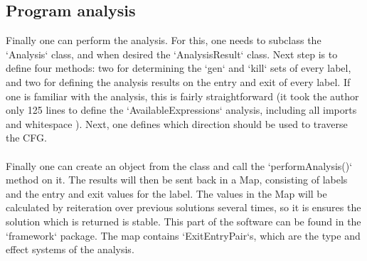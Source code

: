 \documentclass[paper=a4, fontsize=11pt]{scrartcl} %
\numberwithin{equation}{section} %
\numberwithin{figure}{section} %
\numberwithin{table}{section} %
\begin{document}
\subsection{Program analysis}

Finally one can perform the analysis.
For this, one needs to subclass the `Analysis` class, and when desired the `AnalysisResult` class.
Next step is to define four methods: two for determining the `gen` and `kill` sets of every label, and two for defining the analysis results on the entry and exit of every label.
If one is familiar with the analysis, this is fairly straightforward (it took the author only 125 lines to define the `AvailableExpressions` analysis, including all imports and whitespace \cite{ar}). Next, one defines which direction should be used to traverse the CFG.
\\
\\
Finally one can create an object from the class and call the `performAnalysis()` method on it.
The results will then be sent back in a Map, consisting of labels and the entry and exit values for the label.
The values in the Map will be calculated by reiteration over previous solutions several times, so it is ensures the solution which is returned is stable.
This part of the software can be found in the `framework` package. The map contains `ExitEntryPair`s, which are the type and effect systems of the analysis.




\end{document}
